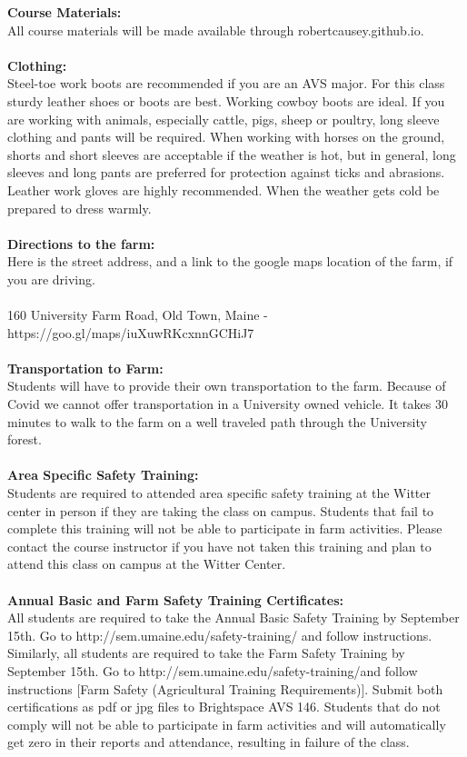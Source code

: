 \documentclass[11pt]{article}
\begin{document}
\noindent \textbf{Course Materials:}\\ 
All course materials will be made available through robertcausey.github.io. \\~\\
\textbf{Clothing:}\\ 
Steel-toe work boots are recommended if you are an AVS major. For this class sturdy leather shoes or boots are best. Working cowboy boots are ideal. If you are working with animals, especially cattle, pigs, sheep or poultry, long sleeve clothing and pants will be required. When working with horses on the ground, shorts and short sleeves are acceptable if the weather is hot, but in general, long sleeves and long pants are preferred for protection against ticks and abrasions. Leather work gloves are highly recommended. When the weather gets cold be prepared to dress warmly.\\~\\ 
\textbf{Directions to the farm:}\\
Here is the street address, and a link to the google maps location of the farm, if you are driving.\\~\\
160 University Farm Road, Old Town, Maine - https://goo.gl/maps/iuXuwRKcxnnGCHiJ7\\~\\
\textbf{Transportation to Farm:}\\
Students will have to provide their own transportation to the farm. Because of Covid we cannot offer transportation in a University owned vehicle. It takes 30 minutes to walk to the farm on a well traveled path through the  University forest. \\~\\ 
\textbf{Area Specific Safety Training:}\\ Students are required to attended area specific safety training at the Witter center in person if they are taking the class on campus. Students that fail to complete this training will not be able to participate in farm activities. Please contact the course instructor if you have not taken this training and plan to attend this class on campus at the Witter Center. \\~\\
\textbf{Annual Basic and Farm Safety Training Certificates:}\\ All students are required to take the Annual Basic Safety Training by September 15th. Go to http://sem.umaine.edu/safety-training/ and follow instructions. Similarly, all students are required to take the Farm Safety Training by September 15th. Go to http://sem.umaine.edu/safety-training/and follow instructions [Farm Safety (Agricultural Training Requirements)]. Submit both certifications as pdf or jpg files to Brightspace AVS 146. Students that do not comply will not be able to participate in farm activities and will automatically get zero in their reports and attendance, resulting in failure of the class.\\~\\ 
\end{document}
